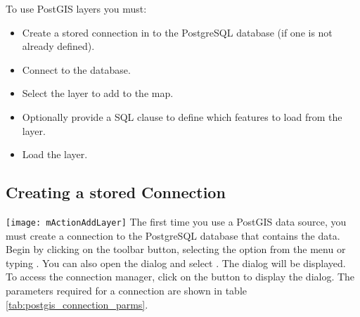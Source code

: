 To use PostGIS layers you must:

\begin{itemize}[label=--]
\item Create a stored connection in \qg to the PostgreSQL database (if one is
not already defined).
\item Connect to the database.
\item Select the layer to add to the map.
\item Optionally provide a SQL 
clause to define which features
to load from the layer.
\item Load the layer.
\end{itemize}

\subsection{Creating a stored
Connection}\label{sec:postgis_stored}

\texttt{[image: mActionAddLayer]} The first time
you use a PostGIS data source, you must create a connection to the PostgreSQL
database that contains the data. Begin by clicking on the
 toolbar button, selecting the
 option from the
 menu or typing . You can also
open the  dialog and select .
The  dialog will
be displayed. To access the connection manager, click on the  button to display the  dialog. The parameters required for a connection are shown
in table \ref{tab:postgis_connection_parms}.


